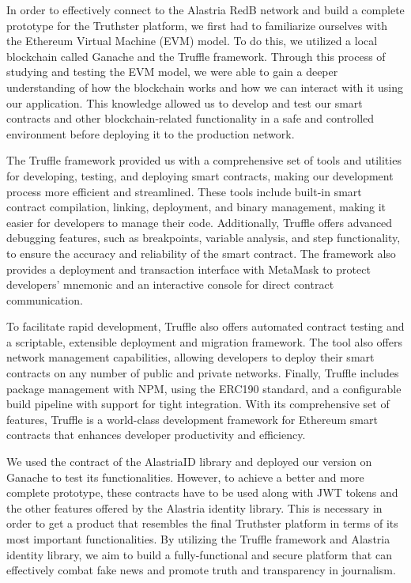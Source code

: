 \documentclass[target=mst,aauheader=]{thud}
\begin{document}
In order to effectively connect to the Alastria RedB network and build a complete prototype for the Truthster platform, we first had to familiarize ourselves with the Ethereum Virtual Machine (EVM) model. To do this, we utilized a local blockchain called Ganache and the Truffle framework. Through this process of studying and testing the EVM model, we were able to gain a deeper understanding of how the blockchain works and how we can interact with it using our application. This knowledge allowed us to develop and test our smart contracts and other blockchain-related functionality in a safe and controlled environment before deploying it to the production network.\par
The Truffle framework provided us with a comprehensive set of tools and utilities for developing, testing, and deploying smart contracts, making our development process more efficient and streamlined. These tools include built-in smart contract compilation, linking, deployment, and binary management, making it easier for developers to manage their code. Additionally, Truffle offers advanced debugging features, such as breakpoints, variable analysis, and step functionality, to ensure the accuracy and reliability of the smart contract. The framework also provides a deployment and transaction interface with MetaMask to protect developers' mnemonic and an interactive console for direct contract communication.\par
To facilitate rapid development, Truffle also offers automated contract testing and a scriptable, extensible deployment and migration framework. The tool also offers network management capabilities, allowing developers to deploy their smart contracts on any number of public and private networks. Finally, Truffle includes package management with NPM, using the ERC190 standard, and a configurable build pipeline with support for tight integration. With its comprehensive set of features, Truffle is a world-class development framework for Ethereum smart contracts that enhances developer productivity and efficiency.\par
We used the contract of the AlastriaID library and deployed our version on Ganache to test its functionalities. However, to achieve a better and more complete prototype, these contracts have to be used along with JWT tokens and the other features offered by the Alastria identity library. This is necessary in order to get a product that resembles the final Truthster platform in terms of its most important functionalities. By utilizing the Truffle framework and Alastria identity library, we aim to build a fully-functional and secure platform that can effectively combat fake news and promote truth and transparency in journalism.
\end{document}
